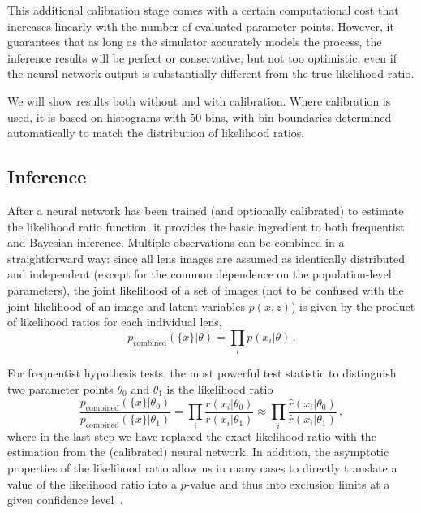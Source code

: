 \documentclass[twocolumn]{aastex63}
\begin{document}
This additional calibration stage comes with a certain computational cost that increases linearly with the number of evaluated parameter points. However, it guarantees that as long as the simulator accurately models the process, the inference results will be perfect or conservative, but not too optimistic, even if the neural network output is substantially different from the true likelihood ratio.

We will show results both without and with calibration. Where calibration is used, it is based on histograms with 50 bins, with bin boundaries determined automatically to match the distribution of likelihood ratios.

\subsection{Inference}
\label{sec:lfi-inference}

After a neural network has been trained (and optionally calibrated) to estimate the likelihood ratio function, it provides the basic ingredient to both frequentist and Bayesian inference. Multiple observations can be combined in a straightforward way: since all lens images are assumed as identically distributed and independent (except for the common dependence on the population-level parameters), the joint likelihood of a set of images (not to be confused with the joint likelihood of an image and latent variables $p(x,z)$) is given by the product of likelihood ratios for each individual lens,
%
\begin{equation}
  p_\mathrm{combined}(\{x\}|\theta) = \prod_{i} p(x_i | \theta) \,.
\end{equation}

For frequentist hypothesis tests, the most powerful test statistic to distinguish two parameter points $\theta_0$ and $\theta_1$ is the likelihood ratio~\citep{1933RSPTA.231..289N}
%
\begin{equation}
    \frac{p_\mathrm{combined}(\{x\}|\theta_0)}{p_\mathrm{combined}(\{x\}|\theta_1)} = \prod_{i} \frac{r(x_i | \theta_0)}{r(x_i | \theta_1)} \approx \prod_{i} \frac{\hat{r}(x_i | \theta_0)}{\hat{r}(x_i | \theta_1)} \,,
\end{equation}
%
where in the last step we have replaced the exact likelihood ratio with the estimation from the (calibrated) neural network. In addition, the asymptotic properties of the likelihood ratio allow us in many cases to directly translate a value of the likelihood ratio into a $p$-value and thus into exclusion limits at a given confidence level~\citep{Wilks:1938dza, Wald, Cowan:2010js}.
\end{document}
